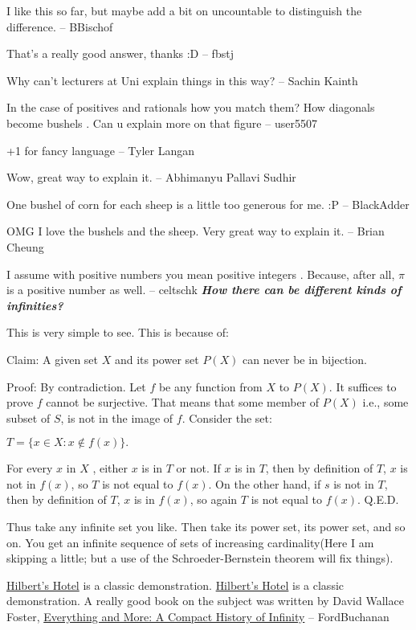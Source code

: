 I like this so far, but maybe add a bit on uncountable to distinguish
the difference. -- BBischof

That's a really good answer, thanks :D -- fbstj

Why can't lecturers at Uni explain things in this way? -- Sachin
Kainth

In the case of positives and rationals how you match them? How diagonals
become  bushels . Can u explain more on
that figure -- user5507

+1 for  fancy language -- Tyler Langan

Wow, great way to explain it. -- Abhimanyu Pallavi Sudhir

One bushel of corn for each sheep is a little too generous for me.
:P -- BlackAdder

OMG I love the bushels and the sheep. Very great way to explain it.
-- Brian Cheung

I assume with  positive numbers you mean
 positive integers . Because, after all,
$\pi$ is a positive number as well. -- celtschk
\em
\es
\bs
\textbf{How there can be different kinds of infinities?}

This is very simple to see. This is because of:

Claim: A given set $X$ and its power set $P(X)$ can never be in
bijection. 

Proof: By contradiction. Let $f$ be any function from $X$ to $P(X)$.
It suffices to prove $f$ cannot be surjective. That means that some
member of $P(X)$ i.e., some subset of $S$, is not in the image of
$f$. Consider the set:

$T=\{ x\in X: x\not\in f(x) \}.$

For every $x$ in $X$ , either $x$ is in $T$ or not. If $x$ is
in $T$, then by definition of $T$, $x$ is not in $f(x)$, so $T$
is not equal to $f(x)$. On the other hand, if $s$ is not in $T$,
then by definition of $T$, $x$ is in $f(x)$, so again $T$ is not
equal to $f(x)$. Q.E.D.

Thus take any infinite set you like. Then take its power set, its
power set, and so on. You get an infinite sequence of sets of increasing
cardinality(Here I am skipping a little; but a use of the Schroeder-Bernstein
theorem will fix things).

\href{http://en.wikipedia.org/wiki/Hilbert\%27s_paradox_of_the_Grand_Hotel}{Hilbert's Hotel}
is a classic demonstration.
\es
\bs
\href{http://en.wikipedia.org/wiki/Hilbert\%27s_paradox_of_the_Grand_Hotel}{Hilbert's Hotel} is a classic demonstration.
\bm
A really good book on the subject was written by David Wallace Foster, 
\href{http://www.amazon.co.uk/Everything-More-Compact-History-Infinity/dp/0753818825/ref=ntt_at_ep_dpt_10}{Everything and More: A Compact History of Infinity} – FordBuchanan

